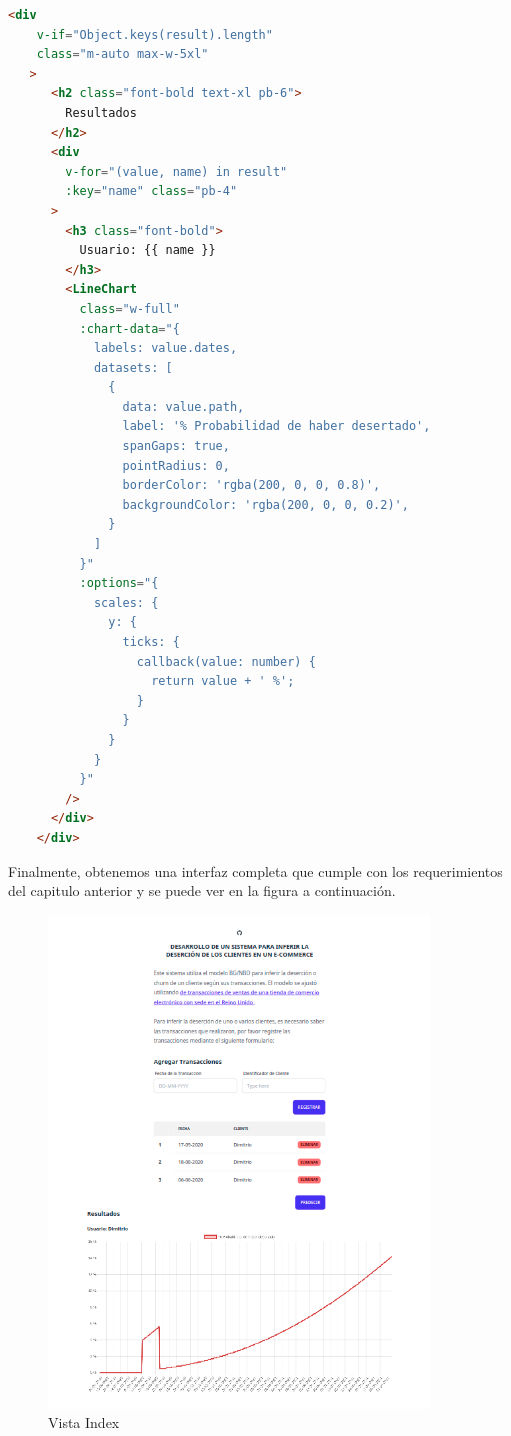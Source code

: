 \begin{lstlisting}[language=HTML, caption=crear gráfico en index.vue]
   <div 
   	v-if="Object.keys(result).length"
   	class="m-auto max-w-5xl"
   >
      <h2 class="font-bold text-xl pb-6">
        Resultados
      </h2>
      <div 
      	v-for="(value, name) in result" 
      	:key="name" class="pb-4"
      >
        <h3 class="font-bold">
          Usuario: {{ name }}
        </h3>
        <LineChart
          class="w-full"
          :chart-data="{
            labels: value.dates,
            datasets: [
              {
                data: value.path,
                label: '% Probabilidad de haber desertado',
                spanGaps: true,
                pointRadius: 0,
                borderColor: 'rgba(200, 0, 0, 0.8)',
                backgroundColor: 'rgba(200, 0, 0, 0.2)',
              }
            ]
          }"
          :options="{
            scales: {
              y: {
                ticks: {
                  callback(value: number) {
                    return value + ' %';
                  }
                }
              }
            }
          }"
        />
      </div>
    </div>
\end{lstlisting}	

Finalmente, obtenemos una interfaz completa que cumple con los requerimientos del capitulo anterior y se puede ver en la figura a continuación.

\begin{figure}[H]
	\centering \includegraphics[width=0.90\textwidth]{images/2.png}
	\caption{Vista Index}
	\label{fig:ui_end}
\end{figure}

